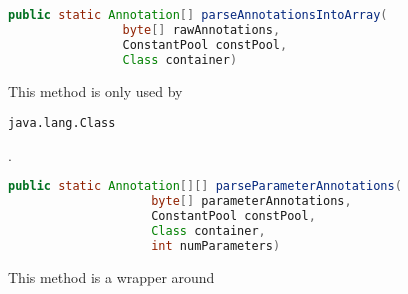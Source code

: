 \documentclass[a4paper, 10pt, titlepage]{scrartcl} %
\begin{document}
\begin{lstlisting}[language=Java,firstnumber=59]
    public static Annotation[] parseAnnotationsIntoArray(
                byte[] rawAnnotations,
                ConstantPool constPool,
                Class container)
\end{lstlisting}
This method is only used by \begin{scriptsize}\verb|java|\hspace{0.0pt}\verb|.|\hspace{0.0pt}\verb|lang|\hspace{0.0pt}\verb|.|\hspace{0.0pt}\verb|Class|\end{scriptsize}.

\begin{lstlisting}[language=Java,firstnumber=79]
    public static Annotation[][] parseParameterAnnotations(
                    byte[] parameterAnnotations,
                    ConstantPool constPool,
                    Class container,
                    int numParameters)
\end{lstlisting}
This method is a wrapper around
\end{document}
